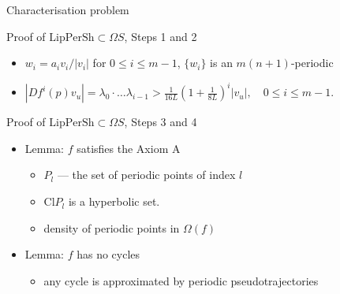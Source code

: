 \documentclass{beamer}
\begin{document}
\begin{section}{Characterisation problem}
\begin{frame}{Proof of $\mbox{LipPerSh}\subset\Omega S$, Steps 1 and 2}
\begin{itemize}
\begin{itemize}
$$\lambda_i=|v_{i+1}|/|v_i|,\quad 	a_0=\tau,\ \  a_{i+1}=\lambda_i a_i-1,$$ %
where $\tau$ is chosen such that $a_m=0$ 
	\item $w_i=a_iv_i/|v_i|$ for $0\leq i\leq m-1$, $\{w_i\}$ is an $m(n+1)$-periodic%
	\item $|Df^i(p)v_u|=\lambda_0\cdot\ldots\lambda_{i-1}>\frac{1}{16L}\left(1+\frac{1}{8L}\right)^i|v_u|, \quad 0\leq i\leq m-1.$
\end{itemize}
\end{itemize}
\end{frame}
\begin{frame}{Proof of $\mbox{LipPerSh}\subset\Omega S$, Steps 3 and 4}
\begin{itemize}
	\item Lemma: $f$ satisfies the Axiom A
\begin{itemize}
  \item $P_l$ --- the set of periodic points of index $l$
	\item $\mbox{Cl}P_l$ is a hyperbolic set.
	\item density of periodic points in $\Omega(f)$
\end{itemize}
	\item Lemma:	$f$ has no cycles 
\begin{itemize}
\item any cycle is approximated by periodic pseudotrajectories

\end{itemize}
\end{itemize}
\end{frame}
\end{section}
\end{document}
